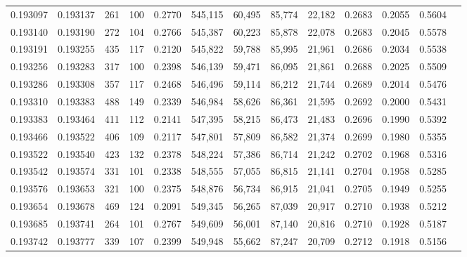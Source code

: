 \begin{tabular}{rrrrrrrrrrrrr}
0.193097 & 0.193137 &   261 & 100 &                                     0.2770 & 545,115 &  60,495 &  85,774 &  22,182 & 0.2683 & 0.2055 & 0.5604 \\
0.193140 & 0.193190 &   272 & 104 &                                     0.2766 & 545,387 &  60,223 &  85,878 &  22,078 & 0.2683 & 0.2045 & 0.5578 \\
0.193191 & 0.193255 &   435 & 117 &                                     0.2120 & 545,822 &  59,788 &  85,995 &  21,961 & 0.2686 & 0.2034 & 0.5538 \\
0.193256 & 0.193283 &   317 & 100 &                                     0.2398 & 546,139 &  59,471 &  86,095 &  21,861 & 0.2688 & 0.2025 & 0.5509 \\
0.193286 & 0.193308 &   357 & 117 &                                     0.2468 & 546,496 &  59,114 &  86,212 &  21,744 & 0.2689 & 0.2014 & 0.5476 \\
0.193310 & 0.193383 &   488 & 149 &                                     0.2339 & 546,984 &  58,626 &  86,361 &  21,595 & 0.2692 & 0.2000 & 0.5431 \\
0.193383 & 0.193464 &   411 & 112 &                                     0.2141 & 547,395 &  58,215 &  86,473 &  21,483 & 0.2696 & 0.1990 & 0.5392 \\
0.193466 & 0.193522 &   406 & 109 &                                     0.2117 & 547,801 &  57,809 &  86,582 &  21,374 & 0.2699 & 0.1980 & 0.5355 \\
0.193522 & 0.193540 &   423 & 132 &                                     0.2378 & 548,224 &  57,386 &  86,714 &  21,242 & 0.2702 & 0.1968 & 0.5316 \\
0.193542 & 0.193574 &   331 & 101 &                                     0.2338 & 548,555 &  57,055 &  86,815 &  21,141 & 0.2704 & 0.1958 & 0.5285 \\
0.193576 & 0.193653 &   321 & 100 &                                     0.2375 & 548,876 &  56,734 &  86,915 &  21,041 & 0.2705 & 0.1949 & 0.5255 \\
0.193654 & 0.193678 &   469 & 124 &                                     0.2091 & 549,345 &  56,265 &  87,039 &  20,917 & 0.2710 & 0.1938 & 0.5212 \\
0.193685 & 0.193741 &   264 & 101 &                                     0.2767 & 549,609 &  56,001 &  87,140 &  20,816 & 0.2710 & 0.1928 & 0.5187 \\
0.193742 & 0.193777 &   339 & 107 &                                     0.2399 & 549,948 &  55,662 &  87,247 &  20,709 & 0.2712 & 0.1918 & 0.5156 \\

\end{tabular}
